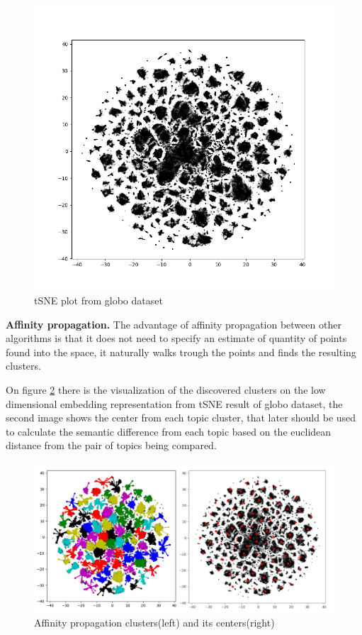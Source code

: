 \documentclass[ecp,tc,english]{iiufrgs}
\begin{document}
    \begin{figure}[H]
        \centering
        \includegraphics[width=1\textwidth]{images/tsne_clusters.png}
        \caption{tSNE plot from globo dataset}
        \label{fig:tsne_plot}
    \end{figure}

    \textbf{Affinity propagation.} The advantage of affinity propagation between other algorithms is that it does not need to specify an estimate of quantity of points found into the space, it naturally walks trough the points and finds the resulting clusters.

    On figure \ref{fig:affinity_twins} there is the visualization of the discovered clusters on the low dimensional embedding representation from tSNE result of globo dataset, the second image shows the center from each topic cluster, that later should be used to calculate the semantic difference from each topic based on the euclidean distance from the pair of topics being compared.
     
    \begin{figure}[H]
        \centering
        \includegraphics[width=1\textwidth]{images/affinity_twins.png}
        \caption{Affinity propagation clusters(left) and its centers(right)}
        \label{fig:affinity_twins}
    \end{figure}
    
\end{document}
